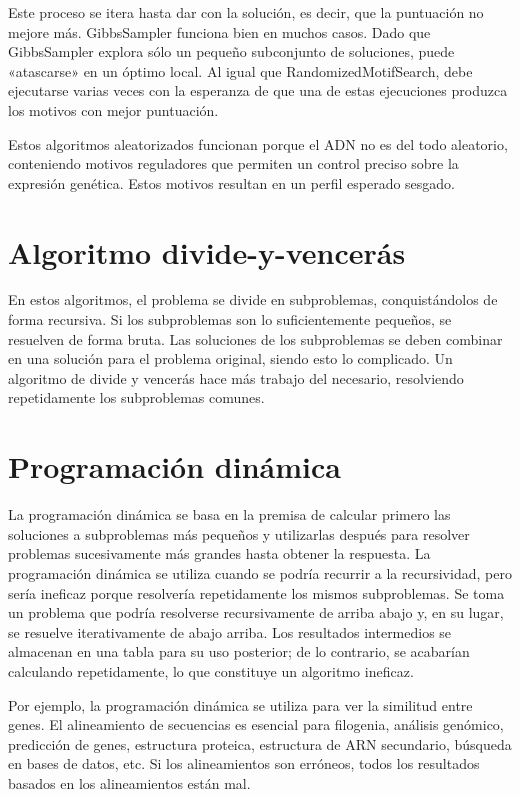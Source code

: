 Este proceso se itera hasta dar con la solución, es decir, que la puntuación no mejore más. 
GibbsSampler funciona bien en muchos casos. Dado que GibbsSampler explora sólo un pequeño subconjunto de soluciones, puede «atascarse» en un óptimo local. Al igual que RandomizedMotifSearch, debe ejecutarse varias veces con la esperanza de que una de estas ejecuciones produzca los motivos con mejor puntuación.

Estos algoritmos aleatorizados funcionan porque el ADN no es del todo aleatorio, conteniendo motivos reguladores que permiten un control preciso sobre la expresión genética. Estos motivos resultan en un perfil esperado sesgado.

\section{Algoritmo divide-y-vencerás}
En estos algoritmos, el problema se divide en subproblemas, conquistándolos de forma recursiva. Si los subproblemas son lo suficientemente pequeños, se resuelven de forma bruta. Las soluciones de los subproblemas se deben combinar en una solución para el problema original, siendo esto lo complicado. Un algoritmo de divide y vencerás hace más trabajo del necesario, resolviendo repetidamente los subproblemas comunes. 

\section{Programación dinámica}
La programación dinámica se basa en la premisa de calcular primero las soluciones a subproblemas más pequeños y utilizarlas después para resolver problemas sucesivamente más grandes hasta obtener la respuesta. La programación dinámica se utiliza cuando se podría recurrir a la recursividad, pero sería ineficaz porque resolvería repetidamente los mismos subproblemas. Se toma un problema que podría resolverse recursivamente de arriba abajo y, en su lugar, se resuelve iterativamente de abajo arriba. Los resultados intermedios se almacenan en una tabla para su uso posterior; de lo contrario, se acabarían calculando repetidamente, lo que constituye un algoritmo ineficaz.

Por ejemplo, la programación dinámica se utiliza para ver la similitud entre genes. El alineamiento de secuencias es esencial para filogenia, análisis genómico, predicción de genes, estructura proteica, estructura de ARN secundario, búsqueda en bases de datos, etc. Si los alineamientos son erróneos, todos los resultados basados en los alineamientos están mal.

